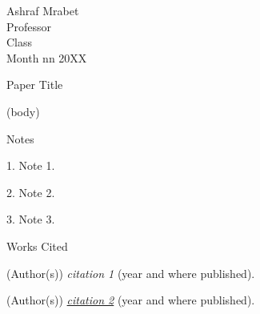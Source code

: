 \documentclass[12pt]{article}
\newcommand{\bibent}{\noindent \hangindent 40pt}
\newenvironment{workscited}{\newpage \begin{center} Works Cited \end{center}}{\newpage }
\begin{document}
		\begin{flushleft}
			Ashraf Mrabet\\
			Professor\\
			Class\\
			Month nn 20XX\\

			\begin{center}
				Paper Title
			\end{center}
			\setlength{\parindent}{0.5in}
			(body)
			
			\newpage
			
			\begin{center}
				Notes
			\end{center}
			\setlength{\parindent}{0.5in}
			
			1. Note 1.
			
			
			2. Note 2.
			
			
			3. Note 3.
			
			\begin{workscited}
				
				\bibent
				(Author(s)) \textit{citation 1} (year and where published).
				
				\bibent
				(Author(s)) \textit{\href{URL}{citation 2}} (year and where published).
				
				
			\end{workscited}
			
		\end{flushleft}
	
\end{document}
